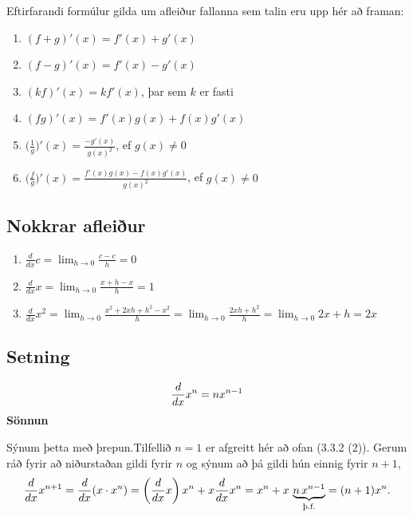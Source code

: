 \documentclass[b5paper,10pt,icelandic]{sphinxmanual}
\begin{document}
Eftirfarandi formúlur gilda um afleiður fallanna sem talin eru upp hér
að framan:
\begin{enumerate}
\item {} 
\((f+g)'(x)=f'(x)+g'(x)\)

\item {} 
\((f-g)'(x)=f'(x)-g'(x)\)

\item {} 
\((kf)'(x)=kf'(x)\), þar sem \(k\) er fasti

\item {} 
\((fg)'(x)=f'(x)g(x)+f(x)g'(x)\)

\item {} 
\(\displaystyle\Bigg(\frac{1}{g}\Bigg)'(x)=\frac{-g'(x)}{g(x)^2}\),
ef \(g(x)\neq 0\)

\item {} 
\(\displaystyle\Bigg(\frac{f}{g}\Bigg)'(x)=
\frac{f'(x)g(x)-f(x)g'(x)}{g(x)^2}\), ef \(g(x)\neq 0\)

\end{enumerate}


\subsection{Nokkrar afleiður}
\label{kafli03:nokkrar-afleiur}\label{kafli03:setning-3-3-2}\begin{enumerate}
\item {} 
\(\frac{d}{dx} c =  \lim_{h\to 0} \frac{c-c}h = 0\)

\item {} 
\(\frac{d}{dx} x =  \lim_{h\to 0} \frac{x+h-x}h = 1\)

\item {} 
\(\frac{d}{dx} x^2 = \lim_{h\to 0} \frac{x^2+2xh+h^2-x^2}h
= \lim_{h\to 0} \frac{2xh + h^2}h = \lim_{h\to 0} 2x+h= 2x\)

\end{enumerate}


\subsection{Setning}
\label{kafli03:setning-3-3-3}\label{kafli03:id5}\begin{gather}
\begin{split}\frac{d}{dx} x^n = n x^{n-1}\end{split}\notag
\end{gather}
\textbf{Sönnun}

Sýnum þetta með þrepun.Tilfellið \(n=1\) er afgreitt hér að ofan
(3.3.2 (2)).
Gerum ráð fyrir að niðurstaðan gildi fyrir \(n\) og sýnum að þá
gildi hún einnig fyrir \(n+1\),
\begin{gather}
\begin{split}\frac{d}{dx} x^{n+1} = \frac{d}{dx} (x\cdot x^n) =
    \left(\frac{d}{dx} x\right) x^n + x\frac{d}{dx} x^n
    = x^n + x\,
    \underbrace{n\, x^{n-1}}_\text{þ.f.}
    = (n+1) x^n.\end{split}\notag
\end{gather}
\end{document}
